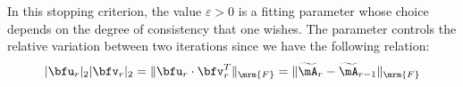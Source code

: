In this stopping criterion, the value $\varepsilon>0$ is a fitting parameter whose choice depends on the degree of consistency 
that one wishes. The parameter controls the relative variation between two iterations since we have the following relation:
\begin{align*}
	\vert \bfu_{r}\vert_{2}\vert \bfv_{r}\vert_{2} = \Vert \bfu_r \cdot \bfv_r^T \Vert_{\mrm{F}} =  \Vert \widetilde{\mA}_{r} - \widetilde{\mA}_{r-1}\Vert_{\mrm{F}}
\end{align*}



